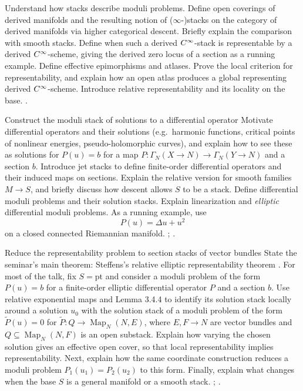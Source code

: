 \documentclass[11pt,a4paper]{book}
\begin{document}
{Understand how stacks describe moduli problems.}
{Define open coverings of derived manifolds and the resulting notion of ($\infty$-)stacks on the category of derived manifolds via higher categorical descent. Briefly explain the comparison with smooth stacks. Define when such a derived $C^\infty$-stack is representable by a derived $C^\infty$-scheme, giving the derived zero locus of a section as a running example. Define effective epimorphisms and atlases. Prove the local criterion for representability, and explain how an open atlas produces a global representing derived $C^\infty$-scheme. Introduce relative representability and its locality on the base. }
{\textcite[Section~2.1]{Steffens_Representability_Elliptic_Moduli}.}

{Construct the moduli stack of solutions to a differential operator}
{Motivate differential operators and their solutions (e.g.\ harmonic functions, critical points of nonlinear energies, pseudo-holomorphic curves), and explain how to see these as solutions for $P(u) = b$ for a map $P\colon \Gamma_N(X \to N) \to \Gamma_N(Y \to N)$ and a section $b$. Introduce jet stacks to define finite-order differential operators and their induced maps on sections. Explain the relative version for smooth families $M\to S$, and briefly discuss how descent allows $S$ to be a stack. Define differential moduli problems and their solution stacks. Explain linearization and \emph{elliptic} differential moduli problems. As a running example, use
	\[
	P(u)=\Delta u+u^2
	\]
	on a closed connected Riemannian manifold.}
{\textcite[Definition~3.2.1, Definition~3.3.7,
	Proposition~3.3.9, and
	Definitions~3.4.1--3.4.2]{Steffens_Representability_Elliptic_Moduli};
	\textcite[Section~4]{Pardon_Representability_Elliptic_Fredholm}.}

{Reduce the representability problem to section stacks of vector bundles}
{State the seminar's main theorem: Steffens's relative elliptic representability theorem \cite[Theorem~3.4.3]{Steffens_Representability_Elliptic_Moduli}. For most of the talk, fix $S = \mathrm{pt}$ and consider a moduli problem of the form $P(u) = b$ for a finite-order elliptic differential operator $P$ and a section $b$. Use relative exponential maps and Lemma 3.4.4 to identify its solution stack locally around a solution $u_0$ with the solution stack of a moduli problem of the form $\widetilde{P}(u) = 0$ for $\widetilde{P}\colon Q \to \operatorname{Map}_N(N,E)$, where $E,F \to N$ are vector bundles and $Q \subseteq \operatorname{Map}_N(N,F)$ is an open substack. Explain how varying the chosen solution gives an effective open cover, so that local representability implies representability. Next, explain how the same coordinate construction reduces a moduli problem $P_1(u_1) = P_2(u_2)$ to this form. Finally, explain what changes when the base $S$ is a general manifold or a smooth stack.}
{\textcite[Theorem~3.4.3, Proposition~3.2.19, Lemmas~3.2.20--3.2.21,
	Proposition~3.3.9, and Lemma~3.4.4]{Steffens_Representability_Elliptic_Moduli};
	\textcite[Introduction and the beginning of Section~5]{Pardon_Representability_Elliptic_Fredholm}.}
\end{document}
